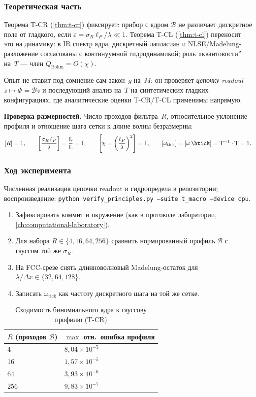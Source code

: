 \subsubsection*{Теоретическая часть}
Теорема T-CR (\cref{thm:t-cr}) фиксирует: прибор с ядром $\mathcal{B}$ не различает дискретное поле от гладкого,
если $\varepsilon=\sigma_R\ell_P/\lambda\ll 1$.
Теорема T-CL (\cref{thm:t-cl}) переносит это на динамику: в IR спектр ядра, дискретный лапласиан и NLSE/Madelung-разложение
согласованы с континуумной гидродинамикой; роль «квантовости'' на~$T$ --- член $Q_{\mathrm{Bohm}}=O(\chi)$.

Опыт не ставит под сомнение сам закон~$g$ на~$M$: он проверяет \emph{цепочку readout} $z\mapsto\Phi=\mathcal{B}z$ и последующий анализ на~$T$
на синтетических гладких конфигурациях, где аналитические оценки T-CR/T-CL применимы напрямую.

\textbf{Проверка размерностей.}
Число проходов фильтра~$R$, относительное уклонение профиля и отношение шага сетки к длине волны безразмерны:
\[
  [R] = 1,\qquad
  \left[\frac{\sigma_R\,\ell_P}{\lambda}\right] = \frac{\mathrm{L}}{\mathrm{L}} = 1,\qquad
  \left[\chi = \left(\frac{\ell_P}{\lambda}\right)^2\right] = 1,\qquad
  [\omega_{\mathrm{tick}}] = [\omega\,\htick] = \mathrm{T^{-1}\cdot T} = 1.
\]

\subsubsection*{Ход эксперимента}
Численная реализация цепочки readout и гидропредела в репозитории; воспроизведение:
\texttt{python verify\_principles.py --suite t\_macro --device cpu}.

\begin{enumerate}[label=\textbf{Шаг \arabic*:},leftmargin=*,itemsep=0.35em]
\item Зафиксировать коммит и окружение (как в протоколе лаборатории, \cref{ch:computational-laboratory}).
\item Для набора $R\in\{4,16,64,256\}$ сравнить нормированный профиль $\mathcal{B}$ с гауссом той же $\sigma_R$.
\item На FCC-срезе снять длинноволновый Madelung-остаток для $\lambda/\Delta x\in\{32,64,128\}$.
\item Записать $\omega_{\mathrm{tick}}$ как частоту дискретного шага на той же сетке.
\end{enumerate}

\begin{table}[htbp]
\centering
\small
\caption{Сходимость биномиального ядра к гауссову профилю (T-CR)}
\label{tab:exp-ce-m-01-gauss}
\begin{tabular}{@{}ll@{}}
\toprule
$R$ (проходов $\mathcal{B}$) & $\max$ отн.\ ошибка профиля \\
\midrule
4 & $8{,}04\times 10^{-5}$ \\
16 & $1{,}57\times 10^{-5}$ \\
64 & $3{,}93\times 10^{-6}$ \\
256 & $9{,}83\times 10^{-7}$ \\
\bottomrule
\end{tabular}
\end{table}

